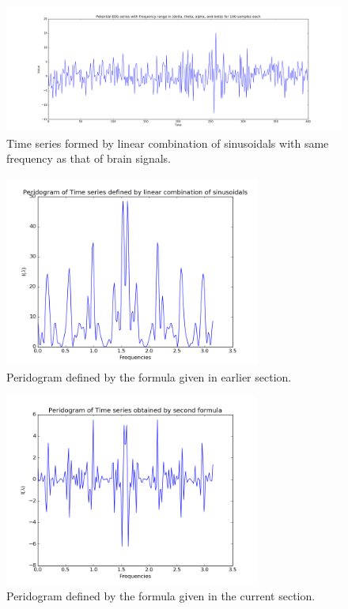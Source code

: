 \documentclass{article}
\begin{document}
\begin{figure}[ht!]
  \centering
  \includegraphics[width=1\textwidth]{images/changepoint_sd/ts}
  \caption{Time series formed by linear combination of sinusoidals with same frequency as that of brain signals.\label{fig:cp_sd_ts}}
\end{figure}

\begin{figure}[ht!]
  \centering
  \includegraphics[width=0.75\textwidth]{images/changepoint_sd/peri1}
  \caption{Peridogram defined by the formula given in earlier section.\label{fig:cp_sd_ts}}
\end{figure}

\begin{figure}[ht!]
  \centering
  \includegraphics[width=0.75\textwidth]{images/changepoint_sd/peri2}
  \caption{Peridogram defined by the formula given in the current section.\label{fig:cp_sd_ts}}
\end{figure}



\end{document}
